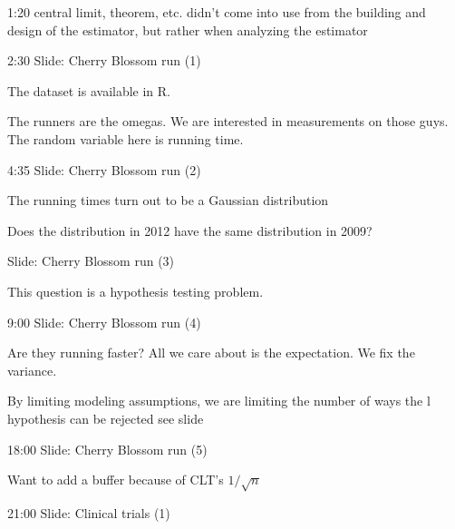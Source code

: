 
1:20 central limit, theorem, etc. didn’t come into use from the building and design of the estimator, but rather when analyzing the estimator

2:30 Slide: Cherry Blossom run (1)

The dataset is available in R.


The runners are the omegas. We are interested in measurements on those guys.  The random variable here is running time.

4:35  Slide: Cherry Blossom run (2)

The running times turn out to be a 
Gaussian distribution

Does the distribution in 2012 have the same distribution in 2009? 

   Slide: Cherry Blossom run (3)

This question is a hypothesis testing problem.

9:00  Slide: Cherry Blossom run (4)

Are they running faster? All we care about is the expectation.  We fix the variance.

By limiting modeling assumptions, we are limiting the number of ways the l hypothesis can be rejected see slide

18:00  Slide: Cherry Blossom run (5)

Want to add a buffer because of CLT’s $1/\sqrt{n}$


21:00  Slide: Clinical trials (1)


